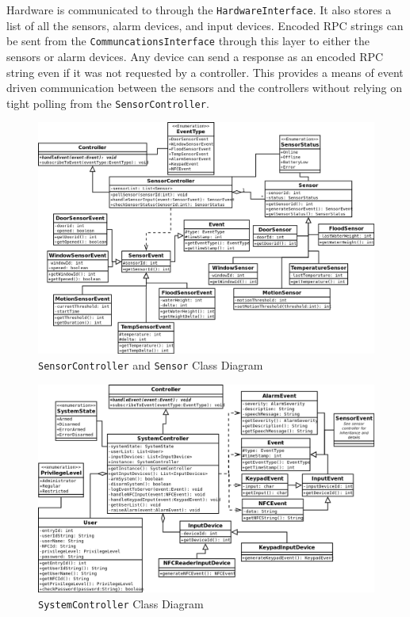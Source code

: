 \documentclass{report}
\begin{document}
Hardware is communicated to through the \texttt{HardwareInterface}. It also
stores a list of all the sensors, alarm devices, and input devices. Encoded RPC
strings can be sent from the \texttt{CommuncationsInterface} through this layer
to either the sensors or alarm devices. Any device can send a response as an
encoded RPC string even if it was not requested by a controller. This provides
a means of event driven communication between the sensors and the controllers
without relying on tight polling from the \texttt{SensorController}.
\begin{landscape} 
\begin{figure}[p]
    \caption{\texttt{SensorController} and \texttt{Sensor} Class Diagram}
    \label{fig:sensor_controller_class_diagram}
    \includegraphics[scale=0.5]{sensor_controller_class_diagram.png}
\end{figure}
\end{landscape} 

\begin{landscape} 
\begin{figure}[p]
    \caption{\texttt{SystemController} Class Diagram}
    \label{fig:system_controller_class_diagram}
    \includegraphics[scale=0.5]{system_controller_class_diagram.png}
\end{figure}
\end{landscape} 
\end{document}
